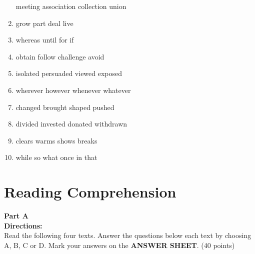 \begin{enumerate}
\fourchoices
{meeting}
{association}
{collection}
{union}




\item


\fourchoices
{grow}
{part}
{deal}
{live}




\item


\fourchoices
{whereas}
{until}
{for}
{if}




\item


\fourchoices
{obtain}
{follow}
{challenge}
{avoid}




\item

\fourchoices
{isolated}
{persuaded}
{viewed}
{exposed}



\item

\fourchoices
{wherever}
{however}
{whenever}
{whatever}


\item


\fourchoices
{changed}
{brought}
{shaped}
{pushed}




\item

\fourchoices
{divided}
{invested}
{donated}
{withdrawn}


\item


\fourchoices
{clears}
{warms}
{shows}
{breaks}




\item


\fourchoices
{while}
{so what}
{once}
{in that}


\end{enumerate}

\vfil

\section{Reading Comprehension}


\noindent
\textbf{Part A}\\
\textbf{ Directions:}\\
 Read the following four texts. Answer the questions below
	each text by choosing A, B, C or
	D. Mark your answers on the \textbf{ANSWER SHEET}. (40 points)

